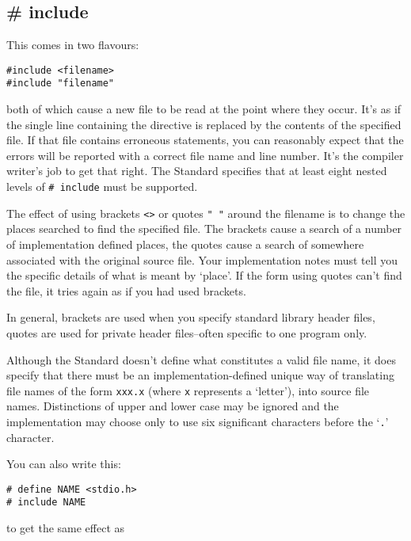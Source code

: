   

  \subsection{\# include}
   

   This comes in two flavours:


   \begin{Verbatim}
#include <filename>
#include "filename"
\end{Verbatim}

   both of which cause a new file to be read at the point where they
    occur. It's as if the single line containing the directive is replaced
    by the contents of the specified file. If that file contains erroneous
    statements, you can reasonably expect that the errors will be reported
    with a correct file name and line number. It's the compiler writer's job
    to get that right. The Standard specifies that at least eight nested
    levels of \texttt{\# include} must be supported.


   The effect of using brackets \texttt{<>} or quotes
    \texttt{" "} around the filename is to change the places
    searched to find the specified file. The brackets cause a search of
    a number of implementation defined places, the quotes cause a search of
    somewhere associated with the original source file. Your implementation
    notes must tell you the specific details of what is meant by
    `place'. If the form using quotes can't find the file, it tries
    again as if you had used brackets.


   In general, brackets are used when you specify standard library header
    files, quotes are used for private header files--often specific to
    one program only.


   Although the Standard doesn't define what constitutes a valid file
    name, it does specify that there must be an implementation-defined
    unique way of translating file names of the form \texttt{xxx.x}
    (where \texttt{x} represents a `letter'), into source file
    names.  Distinctions of upper and lower case may be ignored and the
    implementation may choose only to use six significant characters before
    the `\texttt{.}' character.


   You can also write this:


   \begin{Verbatim}
# define NAME <stdio.h>
# include NAME
\end{Verbatim}

   to get the same effect as



